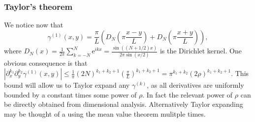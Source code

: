 \documentclass[a4paper,11pt]{article}
\newcommand{\euler}[1]{\text{e}^{#1}}
\newcommand{\abs}[1]{\left\lvert #1 \right\rvert}
\numberwithin{equation}{section}
\begin{document}
	\subsubsection{Taylor's theorem}
	We notice now that \begin{equation}
	\gamma^{(1)}(x,y)=\frac{\pi}{L}\left(D_{N}\left(\pi\frac{x-y}{L}\right)+D_{N}\left(\pi\frac{x+y}{L}\right)\right),
	\end{equation}
	where $ D_N(x)=\frac{1}{2\pi}\sum_{k=-N}^{N}\euler{ikx}=\frac{\sin((N+1/2)x)}{2\pi\sin(x/2)} $ is the Dirichlet kernel. One obvious consequence is that $ \abs{\partial_{x}^{k_1}\partial_{y}^{k_2}\gamma^{(1)}(x,y)}\leq \frac{1}{\pi}(2N)^{k_1+k_2+1}\left(\frac{\pi}{L}\right)^{k_1+k_2+1}=\pi^{k_1+k_2}(2\rho)^{k_1+k_2+1} $. This bound will allow us to Taylor expand any $ \gamma^{(k)} $, as all derivatives are uniformly bounded by a constant times some power of $ \rho $. In fact the relevant power of $ \rho $ can be directly obtained from dimensional analysis. Alternatively Taylor expanding may be thought of a using the mean value theorem mulitple times.
\end{document}

